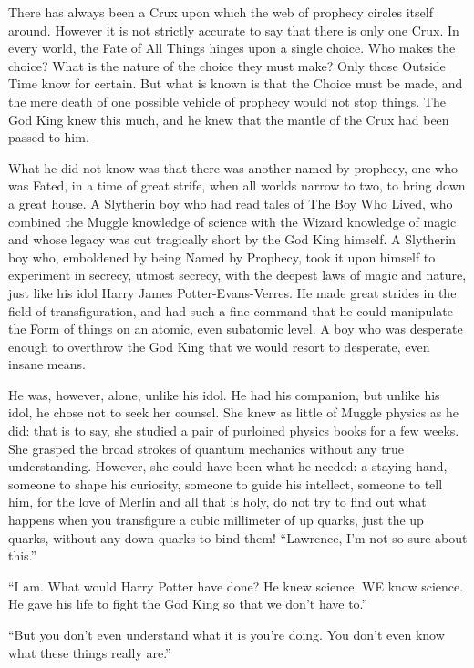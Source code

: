 There has always been a Crux upon which the web of prophecy circles itself around. However it is not strictly accurate to say that there is only one Crux. In every world, the Fate of All Things hinges upon a single choice. Who makes the choice? What is the nature of the choice they must make? Only those Outside Time know for certain. But what is known is that the Choice must be made, and the mere death of one possible vehicle of prophecy would not stop things. The God King knew this much, and he knew that the mantle of the Crux had been passed to him.

What he did not know was that there was another named by prophecy, one who was Fated, in a time of great strife, when all worlds narrow to two, to bring down a great house. A Slytherin boy who had read tales of The Boy Who Lived, who combined the Muggle knowledge of science with the Wizard knowledge of magic and whose legacy was cut tragically short by the God King himself. A Slytherin boy who, emboldened by being Named by Prophecy, took it upon himself to experiment in secrecy, utmost secrecy, with the deepest laws of magic and nature, just like his idol Harry James Potter-Evans-Verres. He made great strides in the field of transfiguration, and had such a fine command that he could manipulate the Form of things on an atomic, even subatomic level. A boy who was desperate enough to overthrow the God King that we would resort to desperate, even insane means.

He was, however, alone, unlike his idol. He had his companion, but unlike his idol, he chose not to seek her counsel. She knew as little of Muggle physics as he did: that is to say, she studied a pair of purloined physics books for a few weeks. She grasped the broad strokes of quantum mechanics without any true understanding. However, she could have been what he needed: a staying hand, someone to shape his curiosity, someone to guide his intellect, someone to tell him, for the love of Merlin and all that is holy, do not try to find out what happens when you transfigure a cubic millimeter of up quarks, just the up quarks, without any down quarks to bind them!
\simpleline
“Lawrence, I’m not so sure about this.”

“I am. What would Harry Potter have done? He knew science. WE know science. He gave his life to fight the God King so that we don’t have to.”

“But you don’t even understand what it is you’re doing. You don’t even know what these things really are.”

